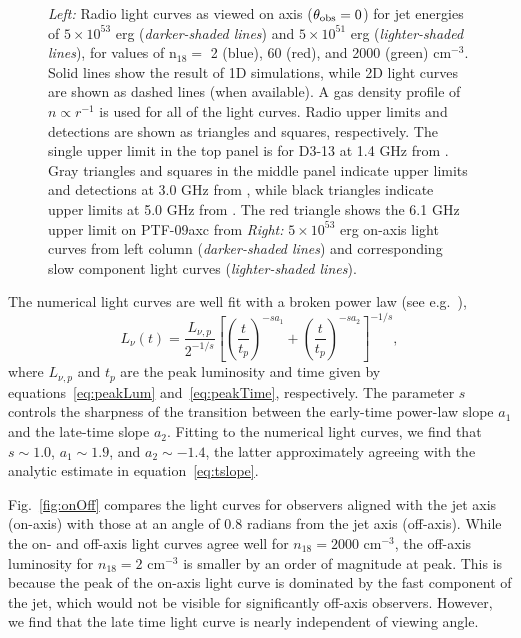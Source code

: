 \documentclass[usenatbib,fleqn]{mnras}
\begin{document}
\begin{figure}
  \caption{\label{fig:lightcurves} \textit{Left:} Radio light curves
    as viewed on axis ($\theta_{\rm obs}=0$) for jet energies of
    $5\times 10^{53}$ erg ({\it darker-shaded lines}) and $5\times
    10^{51}$ erg ({\it lighter-shaded lines}), for values of n$_{18}=$
    2 (blue), 60 (red), and 2000 (green) cm$^{-3}$.  Solid lines show
    the result of 1D simulations, while 2D light curves are shown as
    dashed lines (when available).  A gas density profile of $n\propto
    r^{-1}$ is used for all of the light curves.  Radio upper limits
    and detections are shown as triangles and squares, respectively.
    The single upper limit in the top panel is for D3-13 at 1.4 GHz
    from \citet{Bower2011}.  Gray triangles and squares in the middle
    panel indicate upper limits and detections at 3.0 GHz from
    \citet{Bower+2013}, while black triangles indicate upper limits at
    5.0 GHz from \citet{van-Velzen+2013}.  The red triangle shows the
    6.1 GHz upper limit on PTF-09axc from \citet{Arcavi+2014}
    \textit{Right:} $5\times 10^{53}$ erg on-axis light curves from
    left column ({\it darker-shaded lines}) and corresponding slow
    component light curves ({\it lighter-shaded lines}).}
\end{figure}

The numerical light curves are well fit with a broken power law (see
e.g.~\citealt{Leventis+2012}),
\begin{equation}
L_\nu (t) =\frac{L_{\nu, p}}{2^{-1/s}}
\left[\left(\frac{t}{t_p}\right)^{-s
    a_1}+\left(\frac{t}{t_p}\right)^{-s a_2}\right]^{-1/s}, 
\label{eq:lcAnal}\end{equation}
where $L_{\nu, p}$ and $t_p$ are the peak luminosity and time given by
equations~\eqref{eq:peakLum} and~\eqref{eq:peakTime}, respectively.
The parameter $s$ controls the sharpness of the transition between the
early-time power-law slope $a_1$ and the late-time slope $a_2$.
Fitting to the numerical light curves, we find that $s\sim 1.0$,
$a_1\sim 1.9$, and $a_2\sim -1.4$, the latter approximately agreeing
with the analytic estimate in equation~\eqref{eq:tslope}.


Fig.~\ref{fig:onOff} compares the light curves for observers aligned
with the jet axis (on-axis) with those at an angle of 0.8 radians from
the jet axis (off-axis).  While the on- and off-axis light curves
agree well for $n_{18}=2000$ cm$^{-3}$, the off-axis luminosity for
$n_{18}=2$ cm$^{-3}$ is smaller by an order of magnitude at peak.
This is because the peak of the on-axis light curve is
dominated by the fast component of the jet, which would not be visible
for significantly off-axis observers. However, we find that the late
time light curve is nearly independent of viewing angle.
\end{document}
